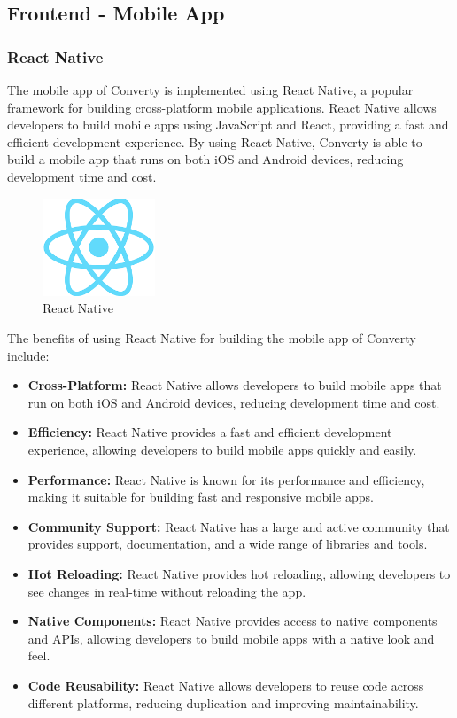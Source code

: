 \subsection{Frontend - Mobile App}

\subsubsection{React Native}
The mobile app of Converty is implemented using React Native, a popular framework for building cross-platform mobile applications. React Native allows developers to build mobile apps using JavaScript and React, providing a fast and efficient development experience. By using React Native, Converty is able to build a mobile app that runs on both iOS and Android devices, reducing development time and cost.

\begin{figure}[H]
    \centering
    \includegraphics[width=0.3\textwidth]{Images/reactNative.png}
    \caption{React Native}
    \label{fig:reactNative}
\end{figure}

The benefits of using React Native for building the mobile app of Converty include:

\begin{itemize}
    \item \textbf{Cross-Platform:} React Native allows developers to build mobile apps that run on both iOS and Android devices, reducing development time and cost.
    \item \textbf{Efficiency:} React Native provides a fast and efficient development experience, allowing developers to build mobile apps quickly and easily.
    \item \textbf{Performance:} React Native is known for its performance and efficiency, making it suitable for building fast and responsive mobile apps.
    \item \textbf{Community Support:} React Native has a large and active community that provides support, documentation, and a wide range of libraries and tools.
    \item \textbf{Hot Reloading:} React Native provides hot reloading, allowing developers to see changes in real-time without reloading the app.
    \item \textbf{Native Components:} React Native provides access to native components and APIs, allowing developers to build mobile apps with a native look and feel.
    \item \textbf{Code Reusability:} React Native allows developers to reuse code across different platforms, reducing duplication and improving maintainability.
\end{itemize}

